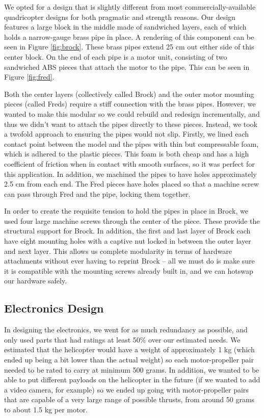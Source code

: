 We opted for a design that is slightly different from most
commercially-available quadricopter designs for both pragmatic and
strength reasons. Our design features a large block in the middle made
of sandwiched layers, each of which holds a narrow-gauge brass pipe in
place. A rendering of this component can be seen in Figure
\ref{fig:brock}. These brass pipes extend 25 cm out either side of this
center block. On the end of each pipe is a motor unit, consisting of
two sandwiched ABS pieces that attach the motor to the pipe. This can
be seen in Figure \ref{fig:fred}.

Both the center layers (collectively called Brock) and the outer motor
mounting pieces (called Freds) require a stiff connection with the
brass pipes. However, we wanted to make this modular so we could
rebuild and redesign incrementally, and thus we didn't want to attach
the pipes directly to these pieces. Instead, we took a twofold
approach to ensuring the pipes would not slip. Firstly, we lined each
contact point between the model and the pipes with thin but
compressable foam, which is adhered to the plastic pieces. This foam
is both cheap and has a high coefficient of friction when in contact
with smooth surfaces, so it was perfect for this application. In
addition, we machined the pipes to have holes approximately 2.5 cm
from each end. The Fred pieces have holes placed so that a machine
screw can pass through Fred and the pipe, locking them together.

In order to create the requisite tension to hold the pipes in place in
Brock, we used four large machine screws through the center of the
piece. These provide the structural support for Brock. In addition,
the first and last layer of Brock each have eight mounting holes
with a captive nut locked in between the outer layer and next
layer. This allows us complete modularity in terms of hardware
attachments without ever having to reprint Brock -- all we must do is
make sure it is compatible with the mounting screws already built in,
and we can hotswap our hardware safely.

\subsection{Electronics Design}
In designing the electronics, we went for as much redundancy as
possible, and only used parts that had ratings at least 50\% over our
estimated needs. We estimated that the helicopter would have a weight
of approximately 1 kg (which ended up being a bit lower than the
actual weight) so each motor-propeller pair needed to be rated to
carry at minimum 500 grams. In addition, we wanted to be able to put
different payloads on the helicopter in the future (if we wanted to
add a video camera, for example) so we ended up going with
motor-propeller pairs that are capable of a very large range of
possible thrusts, from around 50 grams to about 1.5 kg per motor.

